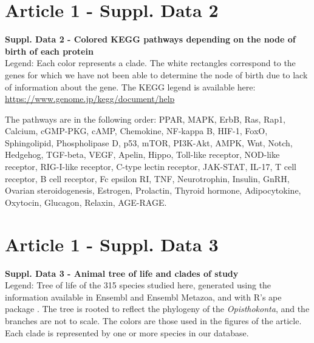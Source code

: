 \section{Article 1 - Suppl. Data 2}
\textbf{Suppl. Data 2 - Colored KEGG pathways depending on the node of birth of each protein}\\
Legend: Each color represents a clade. The white rectangles correspond to the genes for which we have not been able to determine the node of birth due to lack of information about the gene. The KEGG legend is available here: \href{https://www.genome.jp/kegg/document/help_pathway.html}{https://www.genome.jp/kegg/document/help}
\par The pathways are in the following order:
PPAR, MAPK, ErbB, Ras, Rap1, Calcium, cGMP-PKG, cAMP, Chemokine, NF-kappa B, HIF-1, FoxO, Sphingolipid, Phospholipase D, p53,  mTOR, PI3K-Akt, AMPK, Wnt, Notch, Hedgehog, TGF-beta, VEGF, Apelin, Hippo, Toll-like receptor, NOD-like receptor, RIG-I-like receptor, C-type lectin receptor, JAK-STAT, IL-17, T cell receptor, B cell receptor, Fc epsilon RI, TNF, Neurotrophin, Insulin, GnRH, Ovarian steroidogenesis, Estrogen, Prolactin, Thyroid hormone, Adipocytokine, Oxytocin, Glucagon, Relaxin, AGE-RAGE.



\section{Article 1 - Suppl. Data 3}
\textbf{Suppl. Data 3 - Animal tree of life and clades of study}\\
Legend: Tree of life of the 315 species studied here, generated using the information available in Ensembl and Ensembl Metazoa, and with R's ape package \parencite{paradis_ape_2019}. The tree is rooted to reflect the phylogeny of the \textit{Opisthokonta}, and the branches are not to scale. The colors are those used in the figures of the article. Each clade is represented by one or more species in our database.



